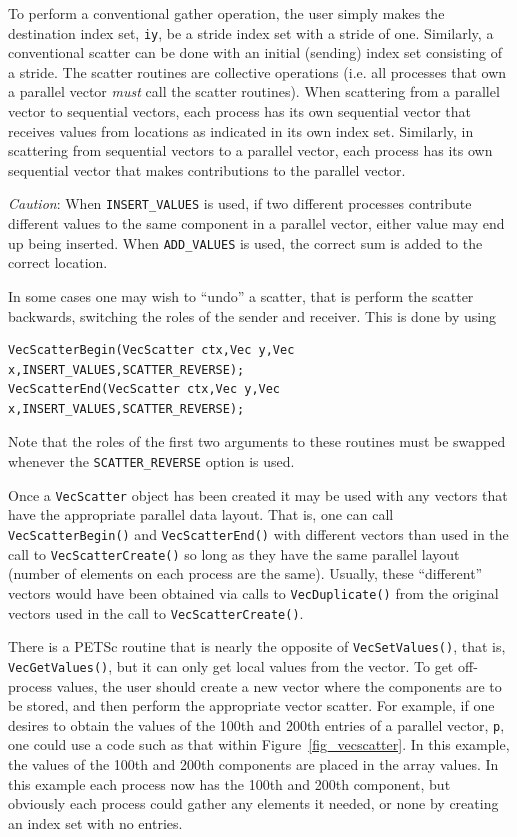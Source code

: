 To perform a conventional gather operation, the user simply makes
 the destination index set,
\lstinline{iy}, be a stride index set with a stride of one.  Similarly, a 
conventional scatter can be done with an initial (sending) index set
consisting of a stride.  The scatter routines are collective operations
(i.e. all processes that own
a parallel vector {\em must} call the scatter routines). When scattering from a
parallel vector to sequential vectors, each process has its own sequential
vector that receives values from locations as indicated in its own
index set. Similarly, in scattering
from sequential vectors to a parallel vector, each process has its
own sequential vector that makes contributions to the parallel vector.

{\em Caution}: When \lstinline{INSERT_VALUES} is used, if two different
processes contribute different values to the same component in a
parallel vector, either value may end up being inserted. When
\lstinline{ADD_VALUES} is used, the correct sum is added to the correct
location.

In some cases one may wish to ``undo'' a scatter, that is perform the
scatter backwards, switching the roles of the sender and receiver. This is
done by using
\begin{lstlisting}
VecScatterBegin(VecScatter ctx,Vec y,Vec x,INSERT_VALUES,SCATTER_REVERSE);
VecScatterEnd(VecScatter ctx,Vec y,Vec x,INSERT_VALUES,SCATTER_REVERSE);
\end{lstlisting}
Note that the roles of the first
two arguments to these routines must be swapped whenever the \lstinline{SCATTER_REVERSE}
option is used.

Once a \lstinline{VecScatter} object has been created it may be used with any vectors
that have the appropriate parallel data layout. That is, one can call
\lstinline{VecScatterBegin()} and \lstinline{VecScatterEnd()} with different vectors than
used in the call to \lstinline{VecScatterCreate()} so long as they have the same
parallel layout (number of elements on each process are the same). Usually,
these ``different'' vectors would have been obtained via calls to
\lstinline{VecDuplicate()} from the original vectors used in the call to
\lstinline{VecScatterCreate()}.

There is a PETSc routine that is nearly the opposite of \lstinline{VecSetValues()}, that is, \lstinline{VecGetValues()}, but it can only get local values from the vector.
To get off-process values, the user should create a new vector where
the components are to be stored, and then perform the appropriate vector
scatter. For example, if one desires to obtain the values of the
100th and 200th entries of a parallel vector, \lstinline{p}, one could use
a code such as that within Figure~\ref{fig_vecscatter}.
In this example, the values of the 100th and 200th components are
placed in the array
values. In this example each process now has the 100th and
200th component, but obviously each process could gather any
elements it needed, or none by creating an index set with no entries.

